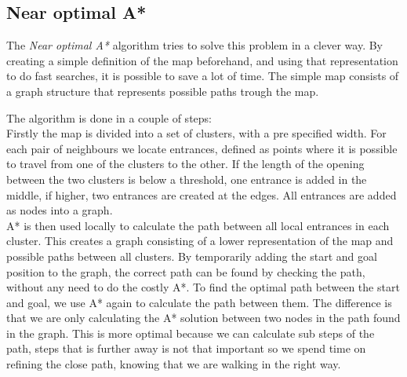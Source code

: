 \documentclass[12 pt]{article} %
\begin{document}
\subsection{Near optimal A*}
The {\it Near optimal A*} algorithm tries to solve this problem in a clever way.
By creating a simple definition of the map beforehand, and using that representation to do fast searches, it is possible to save a lot of time.
The simple map consists of a graph structure that represents possible paths trough the map.\\
\begin{figure}	
	{}
	\label{fig:astarcat}
\end{figure}
The algorithm is done in a couple of steps:\\

Firstly the map is divided into a set of clusters, with a pre specified width.
For each pair of neighbours we locate entrances, defined as points where it is possible to travel from one of the clusters to the other.
If the length of the opening between the two clusters is below a threshold, one entrance is added in the middle, if higher, two entrances are created at the edges.
All entrances are added as nodes into a graph.\\

A* is then used locally to calculate the path between all local entrances in each cluster. 
This creates a graph consisting of a lower representation of the map and possible paths between all clusters.
By temporarily adding the start and goal position to the graph, the correct path can be found by checking the path, without any need to do the costly A*.
To find the optimal path between the start and goal, we use A* again to calculate the path between them.
The difference is that we are only calculating the A* solution between two nodes in the path found in the graph.
This is more optimal because we can calculate sub steps of the path, steps that is further away is not that important so we spend time on refining the close path, knowing that we are walking in the right way.
\end{document}
